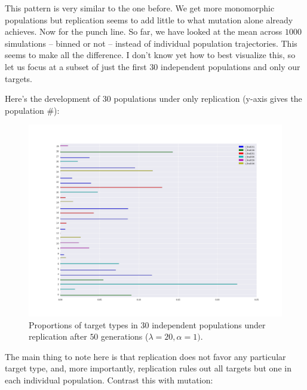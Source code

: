 \documentclass[a4paper]{article}
\begin{document}
This pattern is very similar to the one before. We get more monomorphic populations but replication seems to add little to what mutation alone already achieves. Now for the punch line. So far, we have looked at the mean across $1000$ simulations -- binned or not -- instead of individual population trajectories. This seems to make all the difference. I don't know yet how to best visualize this, so let us focus at a subset of just the first $30$ independent populations and only our targets.

Here's the development of $30$ populations under only replication (y-axis gives the population \#):


\begin{figure}[h!]
  \centering
  \includegraphics[scale=.4]{../code-LOT-extension/plots/r-lam30-a1-k15-s200-l10-meFalse432-nomean.png} %
  \caption{Proportions of target types in $30$ independent populations under replication after $50$ generations ($\lambda = 20, \alpha = 1)$.}
\end{figure}

The main thing to note here is that replication does not favor any particular target type, and, more importantly, replication rules out all targets but one in each individual population. Contrast this with mutation:

\newpage
\end{document}
